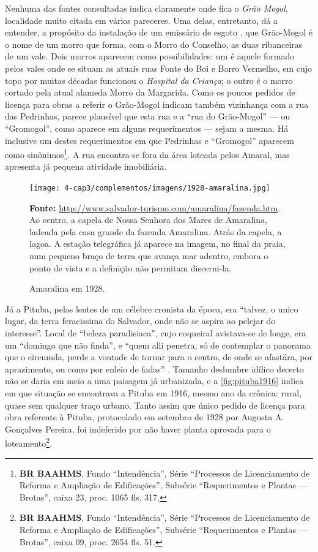 
Nenhuma das fontes consultadas indica claramente onde fica o \textit{Grão Mogol}, localidade muito citada em vários pareceres. Uma delas, entretanto, dá a entender, a propósito da instalação de um emissário de esgoto \cite{bahia_rpe_1895}, que Grão-Mogol é o nome de um morro que forma, com o Morro do Conselho, as duas ribanceiras de um vale. Dois morros aparecem como possibilidades: um é aquele formado pelos vales onde se situam as atuais ruas Fonte do Boi e Barro Vermelho, em cujo topo por muitas décadas funcionou o \textit{Hospital da Criança}; o outro é o morro cortado pela atual alameda Morro da Margarida. Como os poucos pedidos de licença para obras a referir o Grão-Mogol indicam também vizinhança com a rua das Pedrinhas, parece plausível que esta rua e a ``rua do Grão-Mogol'' --- ou ``Gromogol'', como aparece em alguns requerimentos --- sejam a mesma. Há inclusive um destes requerimentos em que Pedrinhas e ``Gromogol'' aparecem como sinônimos\footnote{\textbf{BR BAAHMS}, Fundo ``Intendência'', Série ``Processos de Licenciamento de Reforma e Ampliação de Edificações'', Subsérie ``Requerimentos e Plantas --- Brotas'', caixa 23, proc. 1065 fls. 317.}. A rua encontra-se fora da área loteada pelos Amaral, mas apresenta já pequena atividade imobiliária.

\begin{figure}[!htp]
\centering
\caption{Amaralina em 1928.}
\texttt{[image: 4-cap3/complementos/imagens/1928-amaralina.jpg]}{\par \footnotesize \textbf{Fonte:} \url{http://www.salvador-turismo.com/amaralina/fazenda.htm}. Ao centro, a capela de Nossa Senhora dos Mares de Amaralina, ladeada pela casa grande da fazenda Amaralina. Atrás da capela, a lagoa. A estação telegráfica já aparece na imagem, no final da praia, num pequeno braço de terra que avança mar adentro, embora o ponto de vista e a definição não permitam discerni-la.}
\label{fig:amaralina1928}
\end{figure}

Já a Pituba, pelas lentes de um célebre cronista da época, era ``talvez, o unico lugar, da terra feracissima do Salvador, onde não se aspira ao pelejar do interesse''. Local de ``beleza paradisiaca'', cujo coqueiral avistava-se de longe, era um ``domingo que não finda'', e ``quem alli penetra, só de contemplar o panorama que o circumda, perde a vontade de tornar para o centro, de onde se afastára, por aprazimento, ou como por enleio de fadas'' \cite{campos_pituba_1916}. Tamanho deslumbre idílico decerto não se daria em meio a uma paisagem já urbanizada, e a \autoref{fig:pituba1916} indica em que situação se encontrava a Pituba em 1916, mesmo ano da crônica: rural, quase sem qualquer traço urbano. Tanto assim que único pedido de licença para obra referente à Pituba, protocolado em setembro de 1928 por Augusta A. Gonçalves Pereira, foi indeferido por não haver planta aprovada para o loteamento\footnote{\textbf{BR BAAHMS}, Fundo ``Intendência'', Série ``Processos de Licenciamento de Reforma e Ampliação de Edificações'', Subsérie ``Requerimentos e Plantas --- Brotas'', caixa 09, proc. 2654 fls. 51.}.

